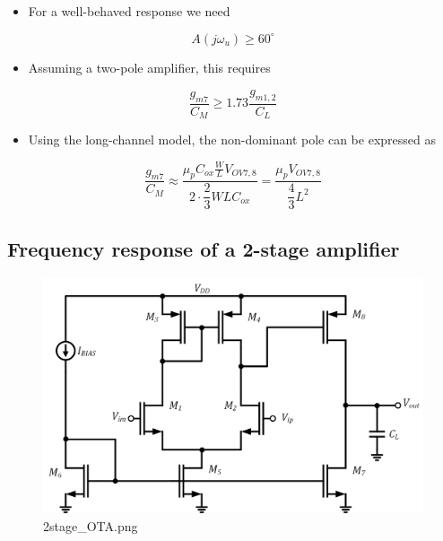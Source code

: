 \documentclass[11pt]{article}
\providecommand{\tightlist}{%
      \setlength{\itemsep}{0pt}\setlength{\parskip}{0pt}}
\begin{document}
    \begin{itemize}
\tightlist
\item
  For a well-behaved response we need
\end{itemize}

\begin{equation}
A(j\omega_u) \geq 60^{\circ}
\end{equation}

\begin{itemize}
\tightlist
\item
  Assuming a two-pole amplifier, this requires
\end{itemize}

\begin{equation}
\dfrac{g_{m7}}{C_M} \geq 1.73 \dfrac{g_{m1,2}}{C_L}
\end{equation}

\begin{itemize}
\tightlist
\item
  Using the long-channel model, the non-dominant pole can be expressed
  as
\end{itemize}

\begin{equation}
\dfrac{g_{m7}}{C_M} \approx \dfrac{\mu_p C_{ox}\frac{W}{L}V_{OV7,8}}{2\cdot\dfrac{2}{3}WLC_{ox}} = \dfrac{\mu_p V_{OV7,8}}{\dfrac{4}{3}L^2}
\end{equation}

    \hypertarget{frequency-response-of-a-2-stage-amplifier}{%
\subsection{Frequency response of a 2-stage
amplifier}\label{frequency-response-of-a-2-stage-amplifier}}

    \begin{figure}
\centering
\includegraphics{2stage_OTA.png}
\caption{2stage\_OTA.png}
\end{figure}
\end{document}
